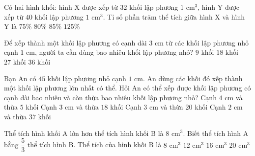 \begin{ex} %
Có hai hình khối: hình X được xếp từ $32$ khối lập phương $1\text{ cm}^3$, hình Y được xếp từ $40$ khối lập phương $1\text{ cm}^3$. Tỉ số phần trăm thể tích giữa hình X và hình Y là
\choice
{$75\%$}
{\True $80\%$}
{$85\%$}
{$125\%$}
\end{ex}

\begin{ex} %
Để xếp thành một khối lập phương có cạnh dài $3\text{ cm}$ từ các khối lập phương nhỏ cạnh $1\text{ cm}$, người ta cần dùng bao nhiêu khối lập phương nhỏ?
\choice
{$9\text{ khối}$}
{$18\text{ khối}$}
{\True $27\text{ khối}$}
{$36\text{ khối}$}
\end{ex}

\begin{ex} %
Bạn An có $45$ khối lập phương nhỏ cạnh $1\text{ cm}$. An dùng các khối đó xếp thành một khối lập phương lớn nhất có thể. Hỏi An có thể xếp được khối lập phương có cạnh dài bao nhiêu và còn thừa bao nhiêu khối lập phương nhỏ?
\choice
{Cạnh $4\text{ cm}$ và thừa $5$ khối}
{\True Cạnh $3\text{ cm}$ và thừa $18$ khối}
{Cạnh $3\text{ cm}$ và thừa $20$ khối}
{Cạnh $2\text{ cm}$ và thừa $37$ khối}
\end{ex}

\begin{ex} %
Thể tích hình khối A lớn hơn thể tích hình khối B là $8\text{ cm}^3$. Biết thể tích hình A bằng $\dfrac{5}{3}$ thể tích hình B. Thể tích của hình khối B là
\choice
{$8\text{ cm}^3$}
{\True $12\text{ cm}^3$}
{$16\text{ cm}^3$}
{$20\text{ cm}^3$}
\end{ex}

